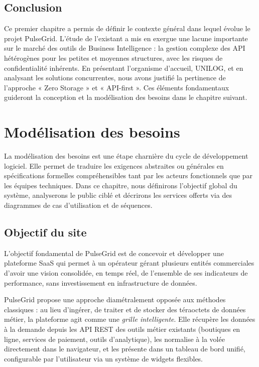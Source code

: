 ﻿\documentclass[12pt,a4paper,oneside]{report} %
\begin{document}
\section{Conclusion}

Ce premier chapitre a permis de définir le contexte général dans lequel évolue le projet PulseGrid. L'étude de l'existant a mis en exergue une lacune importante sur le marché des outils de Business Intelligence : la gestion complexe des API hétérogènes pour les petites et moyennes structures, avec les risques de confidentialité inhérents. En présentant l'organisme d'accueil, UNILOG, et en analysant les solutions concurrentes, nous avons justifié la pertinence de l'approche « Zero Storage » et « API-first ». Ces éléments fondamentaux guideront la conception et la modélisation des besoins dans le chapitre suivant.

\chapter{Modélisation des besoins}

La modélisation des besoins est une étape charnière du cycle de développement logiciel. Elle permet de traduire les exigences abstraites ou générales en spécifications formelles compréhensibles tant par les acteurs fonctionnels que par les équipes techniques. Dans ce chapitre, nous définirons l'objectif global du système, analyserons le public ciblé et décrirons les services offerts via des diagrammes de cas d'utilisation et de séquences.

\section{Objectif du site}

L'objectif fondamental de PulseGrid est de concevoir et développer une plateforme SaaS qui permet à un opérateur gérant plusieurs entités commerciales d'avoir une vision consolidée, en temps réel, de l'ensemble de ses indicateurs de performance, sans investissement en infrastructure de données.

PulseGrid propose une approche diamétralement opposée aux méthodes classiques : au lieu d'ingérer, de traiter et de stocker des téraoctets de données métier, la plateforme agit comme une \textit{grille intelligente}. Elle récupère les données à la demande depuis les API REST des outils métier existants (boutiques en ligne, services de paiement, outils d'analytique), les normalise à la volée directement dans le navigateur, et les présente dans un tableau de bord unifié, configurable par l'utilisateur via un système de widgets flexibles.
\end{document}

